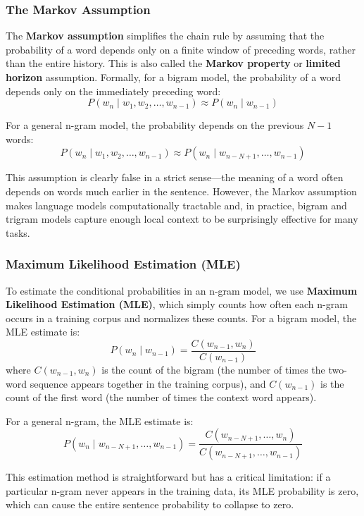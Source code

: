 \documentclass[11pt,a4paper]{article}
\begin{document}
\subsubsection{The Markov Assumption}

The \textbf{Markov assumption} simplifies the chain rule by assuming that the probability of a word depends only on a finite window of preceding words, rather than the entire history. This is also called the \textbf{Markov property} or \textbf{limited horizon} assumption. Formally, for a bigram model, the probability of a word depends only on the immediately preceding word:
\[
P(w_n \mid w_1, w_2, \ldots, w_{n-1}) \approx P(w_n \mid w_{n-1})
\]

For a general n-gram model, the probability depends on the previous $N-1$ words:
\[
P(w_n \mid w_1, w_2, \ldots, w_{n-1}) \approx P(w_n \mid w_{n-N+1}, \ldots, w_{n-1})
\]

This assumption is clearly false in a strict sense---the meaning of a word often depends on words much earlier in the sentence. However, the Markov assumption makes language models computationally tractable and, in practice, bigram and trigram models capture enough local context to be surprisingly effective for many tasks.

\subsubsection{Maximum Likelihood Estimation (MLE)}

To estimate the conditional probabilities in an n-gram model, we use \textbf{Maximum Likelihood Estimation (MLE)}, which simply counts how often each n-gram occurs in a training corpus and normalizes these counts. For a bigram model, the MLE estimate is:
\[
P(w_n \mid w_{n-1}) = \frac{C(w_{n-1}, w_n)}{C(w_{n-1})}
\]
where $C(w_{n-1}, w_n)$ is the count of the bigram (the number of times the two-word sequence appears together in the training corpus), and $C(w_{n-1})$ is the count of the first word (the number of times the context word appears).

For a general n-gram, the MLE estimate is:
\[
P(w_n \mid w_{n-N+1}, \ldots, w_{n-1}) = \frac{C(w_{n-N+1}, \ldots, w_n)}{C(w_{n-N+1}, \ldots, w_{n-1})}
\]

This estimation method is straightforward but has a critical limitation: if a particular n-gram never appears in the training data, its MLE probability is zero, which can cause the entire sentence probability to collapse to zero.
\end{document}
